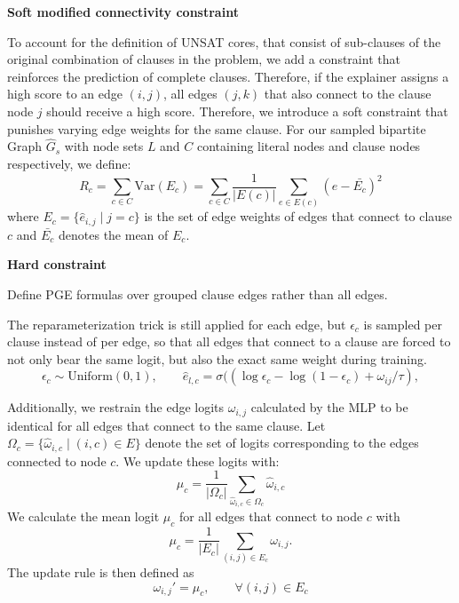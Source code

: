 \textbf{Soft modified connectivity constraint}

To account for the definition of UNSAT cores, that consist of sub-clauses of the original combination of clauses in the problem, we add a constraint that reinforces the prediction of complete clauses. Therefore, if the explainer assigns a high score to an edge $(i,j)$, all edges $(j,k)$ that also connect to the clause node $j$ should receive a high score. Therefore, we introduce a soft constraint that punishes varying edge weights for the same clause. For our sampled bipartite Graph $\hat{G}_s$ with node sets $L$ and $C$ containing literal nodes and clause nodes respectively, we define:
\begin{equation*}
    R_c = \sum_{c \in C}  \text{Var}(E_c) = \sum_{c \in C} \frac{1}{|E(c)|} \sum_{e \in E(c)} (e - \bar{E_c})^2
\end{equation*}
where $E_c = \{\hat{e}_{i,j} \mid j=c\}$ is the set of edge weights of edges that connect to clause $c$ and $\bar{E_c}$ denotes the mean of $E_c$.


\textbf{Hard constraint}

Define PGE formulas over grouped clause edges rather than all edges.

The reparameterization trick is still applied for each edge, but $\epsilon_c$ is sampled per clause instead of per edge, so that all edges that connect to a clause are forced to not only bear the same logit, but also the exact same weight during training.
\begin{equation}
    \epsilon_c \sim \text{Uniform}(0,1), \qquad \hat{e}_{l,c}=\sigma((\log \epsilon_c - \log(1-\epsilon_c)+\omega_{ij}/\tau),
\end{equation}

Additionally, we restrain the edge logits $\omega_{i,j}$ calculated by the MLP to be identical for all edges that connect to the same clause. Let $\Omega_c = \{\hat{\omega}_{i,c} \mid (i,c)\in E\}$ denote the set of logits corresponding to the edges connected to node $c$. We update these logits with:
\begin{equation}
    \mu_c = \frac{1}{|\Omega_c|} \sum_{\hat{\omega}_{i,c} \in \Omega_c} \hat{\omega}_{i,c}
\end{equation}
We calculate the mean logit $\mu_c$ for all edges that connect to node $c$ with
\begin{equation}
    \mu_c = \frac{1}{|E_c|} \sum_{(i,j)\in E_c}\omega_{i,j}.
\end{equation}
The update rule is then defined as 
\begin{equation}
    \omega_{i,j}' =\mu_c, \qquad \forall(i,j) \in E_c
\end{equation}



